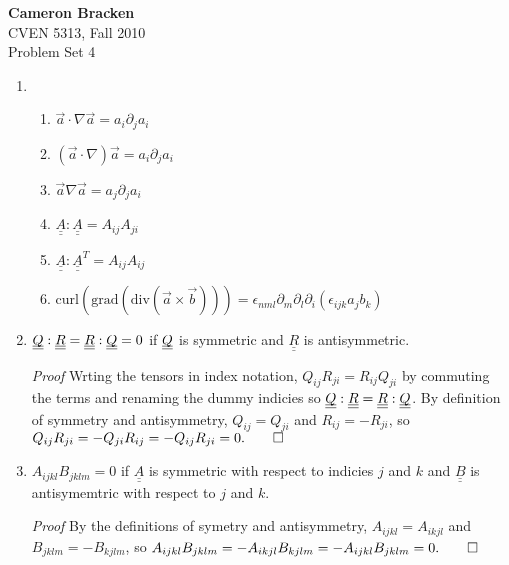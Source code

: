 \documentclass[11pt,twoside]{article}
\renewcommand{\d}{\partial}
\newcommand{\vect}[1]{\vec{#1}}
\newcommand{\grad}{\nabla}
\newcommand{\tensor}[1]{\underline{\underline{#1}}}
\newcommand{\cross}{\times}
\newcommand{\curl}{\mbox{curl}}
\newcommand{\gradf}{\mbox{grad}}
\newcommand{\divf}{\mbox{div}}
\begin{document}
\thispagestyle{empty}
\noindent\textbf{Cameron Bracken}\\
CVEN 5313, Fall 2010\\
Problem Set 4


\begin{enumerate}

%
%
\item 
\begin{enumerate}

\item $ \vect{a} \cdot \nabla \vect{a} = a_{i}\d _{j}a_{i} $
\item $ (\vect{a}\cdot\nabla)\vect{a} = a_{i}\d _{j}a_{i} $
\item $ \vect{a}\grad\vect{a} = a_{j}\d_{j}a_{i} $
\item $ \tensor{A}:\tensor{A} = A_{ij}A_{ji} $
\item $ \tensor{A}:\tensor{A}^{T} = A_{ij}A_{ij} $
\item $ \curl(\gradf(\divf(\vect{a}\cross\vect{b}))) = \epsilon_{nml}\d_{m}\d_{l}\d_{i}(\epsilon_{ijk}a_{j}b_{k}) $
\end{enumerate}

%
%
\item $\tensor{\smash[b]{Q}}:\tensor{R} = \tensor{R}:\tensor{\smash[b]{Q}} = 0$ if $\tensor{\smash[b]{Q}}$ is symmetric and $\tensor{R}$ is antisymmetric. 

\textit{Proof} Wrting the tensors in index notation, $Q_{ij}R_{ji} = R_{ij}Q_{ji}$ by commuting the terms and renaming the dummy indicies so $\tensor{\smash[b]{Q}}:\tensor{R} = \tensor{R}:\tensor{\smash[b]{Q}}$.  By definition of symmetry and antisymmetry, $Q_{ij} = Q_{ji}$ and $R_{ij} = -R_{ji}$, so $Q_{ij}R_{ji} = - Q_{ji}R_{ij} = - Q_{ij}R_{ji} = 0. \qed$

%
%
\item $A_{ijkl}B_{jklm}=0$ if $\tensor{A}$ is symmetric with respect to indicies $j$ and $k$ and $\tensor{B}$ is antisymemtric with respect to $j$ and $k$.

\textit{Proof} By the definitions of symetry and antisymmetry, $A_{ijkl}= A_{ikjl}$ and $B_{jklm}=-B_{kjlm}$, so $A_{ijkl}B_{jklm} = - A_{ikjl}B_{kjlm} = -A_{ijkl}B_{jklm} = 0. \qed$


\end{enumerate}
\end{document}
